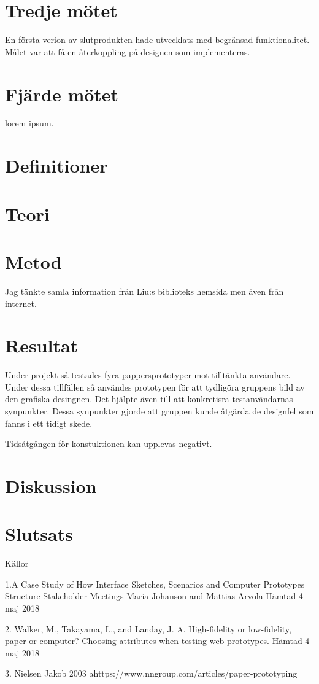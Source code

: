      
\section{Tredje mötet}
En första verion av slutprodukten hade utvecklats med begränsad funktionalitet. Målet var att få en återkoppling på designen som implementeras.   

\section{Fjärde mötet}
lorem ipsum.

\section{Definitioner}
  
\section{Teori}

\section{Metod}
Jag tänkte samla information från Liu:s biblioteks hemsida men även från internet. 

\section{Resultat}
Under projekt så testades fyra pappersprototyper mot tilltänkta användare. Under dessa tillfällen så användes prototypen för att tydligöra gruppens bild av den grafiska desingnen. Det hjälpte även till att konkretisra testanvändarnas synpunkter. Dessa synpunkter gjorde att gruppen kunde åtgärda de designfel som fanns i ett tidigt skede. 

Tidsåtgången för konstuktionen kan upplevas negativt.   

\section{Diskussion}

\section{Slutsats}

Källor

1.A Case Study of How Interface Sketches, Scenarios and Computer Prototypes Structure Stakeholder Meetings Maria Johanson and Mattias Arvola Hämtad 4 maj 2018  

2. Walker, M., Takayama, L., and Landay, J. A. High-fidelity or low-fidelity, paper or computer? Choosing attributes when testing web prototypes. Hämtad 4 maj 2018  

3. Nielsen Jakob 2003 
ahttps://www.nngroup.com/articles/paper-prototyping 